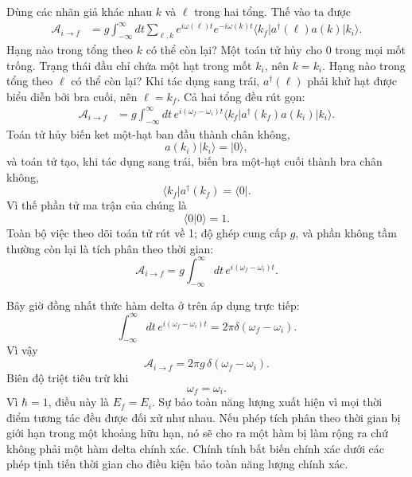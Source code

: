 Dùng các nhãn giả khác nhau \(k\) và \(\ell\) trong hai tổng. Thế vào ta được
\begin{align}
\mathcal A_{i\to f}
&=g\int_{-\infty}^{\infty}dt
\sum_{\ell,k}
e^{i\omega(\ell)t}e^{-i\omega(k)t}
\langle k_f\rvert a^\dagger(\ell)a(k)\lvert k_i\rangle.
\end{align}
Hạng nào trong tổng theo \(k\) có thể còn lại? Một toán tử hủy cho 0 trong mọi mốt trống. Trạng thái đầu chỉ chứa một hạt trong mốt \(k_i\), nên \(k=k_i\). Hạng nào trong tổng theo \(\ell\) có thể còn lại? Khi tác dụng sang trái, \(a^\dagger(\ell)\) phải khử hạt được biểu diễn bởi bra cuối, nên \(\ell=k_f\). Cả hai tổng đều rút gọn:
\begin{align}
\mathcal A_{i\to f}
&=g\int_{-\infty}^{\infty}dt\,
e^{i(\omega_f-\omega_i)t}
\langle k_f\rvert a^\dagger(k_f)a(k_i)\lvert k_i\rangle.
\end{align}
Toán tử hủy biến ket một-hạt ban đầu thành chân không,
\begin{equation}
a(k_i)\lvert k_i\rangle=\lvert0\rangle,
\end{equation}
và toán tử tạo, khi tác dụng sang trái, biến bra một-hạt cuối thành bra chân không,
\begin{equation}
\langle k_f\rvert a^\dagger(k_f)=\langle0\rvert.
\end{equation}
Vì thế phần tử ma trận của chúng là
\begin{equation}
\langle0\vert0\rangle=1.
\end{equation}
Toàn bộ việc theo dõi toán tử rút về 1; độ ghép cung cấp \(g\), và phần không tầm thường còn lại là tích phân theo thời gian:
\begin{equation}
\mathcal A_{i\to f}
=g\int_{-\infty}^{\infty}dt\,
e^{i(\omega_f-\omega_i)t}.
\end{equation}


Bây giờ đồng nhất thức hàm delta ở trên áp dụng trực tiếp:
\begin{equation}
\int_{-\infty}^{\infty}dt\,
e^{i(\omega_f-\omega_i)t}
=2\pi\delta(\omega_f-\omega_i).
\end{equation}
Vì vậy
\begin{equation}
\boxed{
\mathcal A_{i\to f}
=2\pi g\,\delta(\omega_f-\omega_i)
}.
\end{equation}
Biên độ triệt tiêu trừ khi
\begin{equation}
\omega_f=\omega_i.
\end{equation}
Vì \(\hbar=1\), điều này là \(E_f=E_i\). Sự bảo toàn năng lượng xuất hiện vì mọi thời điểm tương tác đều được đối xử như nhau. Nếu phép tích phân theo thời gian bị giới hạn trong một khoảng hữu hạn, nó sẽ cho ra một hàm bị làm rộng ra chứ không phải một hàm delta chính xác. Chính tính bất biến chính xác dưới các phép tịnh tiến thời gian cho điều kiện bảo toàn năng lượng chính xác.

